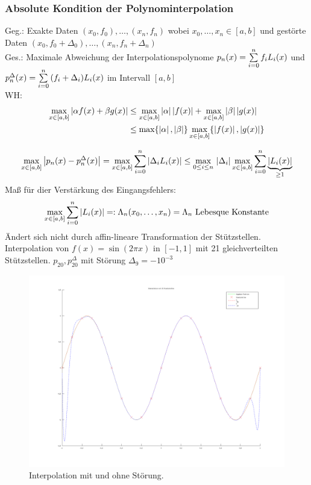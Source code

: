 \subsubsection{Absolute Kondition der Polynominterpolation}
Geg.: Exakte Daten $(x_0, f_0), \ldots, (x_n, f_n)$ wobei $x_0, \ldots, x_n \in [a, b]$ und
gestörte Daten $(x_0, f_0 + \Delta_0), \ldots, (x_n, f_n + \Delta_n)$ \\
Ges.: Maximale Abweichung der Interpolationspolynome $p_n(x) = \sum\limits_{i=0}^{n}{f_i L_i(x)}$ und
$p^{\Delta}_n(x) = \sum\limits_{i=0}^{n}{(f_i + \Delta_i) L_i(x)}$ im Intervall $[a, b]$ \\
WH:
\begin{align*}
  \underset{x \in [a, b]}{\max} \left| \alpha f(x) + \beta g(x) \right| &\leq
    \underset{x \in [a, b]}{\max} \left| \alpha \right| \left| f(x) \right| + \underset{x \in [a, b]}{\max} \left| \beta \right| \left| g(x) \right| \\
  &\leq \max\{\left| \alpha \right|, \left| \beta \right|\}\, \underset{x \in [a, b]}{\max}\{\left| f(x) \right|, \left| g(x) \right|\}
\end{align*}

\begin{align*}
  \underset{x \in [a, b]}{\max} \left| p_n(x) - p^{\Delta}_n(x) \right| = \underset{x \in [a, b]}{\max} \sum\limits_{i=0}^{n}{\left| \Delta_i L_i(x) \right| } \leq
  \underset{0 \leq i \leq n}{\max}\,\left| \Delta_i \right| \underset{x \in [a, b]}{\max} \sum\limits_{i=0}^{n}{\underbrace{\left| L_i(x) \right|}_{\geq 1}}
\end{align*}
Maß für dier Verstärkung des Eingangsfehlers:
\begin{equation*}
  \underset{x \in [a, b]}{\max} \sum\limits_{i=0}^{n}{\left| L_i(x) \right|} =: \Lambda_n(x_0, \dots, x_n) = \Lambda_n 
  \text{ Lebesque Konstante}
\end{equation*}
Ändert sich nicht durch affin-lineare Transformation der Stützstellen.
 Interpolation von $f(x) =\sin(2\pi x)$ in $[-1, 1]$ mit 21
gleichverteilten Stützstellen. $p_{20}, p_{20}^\Delta$ mit Störung $\Delta_9 = -10^{-3}$
\begin{figure}[htbp]
  \centering
  \includegraphics[width=\textwidth]{figures/interpolation_stoerung.png}
  \caption{Interpolation mit und ohne Störung.}
  \label{fig:interpolation-stoerung}
\end{figure}

